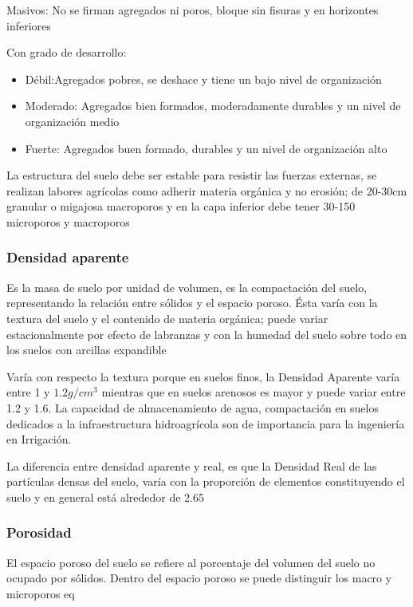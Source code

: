 Masivos: No se firman agregados ni poros, bloque sin fisuras y en horizontes inferiores

Con grado de desarrollo: 
\begin{itemize}
    \item Débil:Agregados pobres, se deshace y tiene un bajo nivel de organización
    \item Moderado: Agregados bien formados, moderadamente durables y un nivel de organización medio
    \item Fuerte: Agregados buen formado, durables y un nivel de organización alto
\end{itemize}
La estructura del suelo debe ser estable para resistir las fuerzas externas, se realizan labores agrícolas como adherir materia orgánica y no erosión; de 20-30cm granular o migajosa macroporos y en la capa inferior debe tener 30-150 microporos y macroporos

\subsubsection{Densidad aparente}

\begin{definition}
    Es la masa de suelo por unidad de volumen, es la compactación del suelo, representando la relación entre sólidos y el espacio poroso. Ésta varía con la textura del suelo y el contenido de materia orgánica; puede variar estacionalmente por efecto de labranzas y con la humedad del suelo sobre todo en los suelos con arcillas expandible
\end{definition}
Varía con respecto la textura porque en suelos finos, la Densidad Aparente varía entre 1 y $1.2 g/cm^3$ mientras que en suelos arenosos es mayor y puede variar entre 1.2 y 1.6. La capacidad de almacenamiento de agua, compactación en suelos dedicados a la infraestructura hidroagrícola son de importancia para la ingeniería en Irrigación.

La diferencia entre densidad aparente y real, es que la Densidad Real de las partículas densas del suelo, varía con la proporción de elementos constituyendo el suelo y en general está alrededor de 2.65

\subsubsection{Porosidad}

El espacio poroso del suelo se refiere al porcentaje del volumen del suelo no ocupado por sólidos. Dentro del espacio poroso se puede distinguir los macro y microporos
eq

